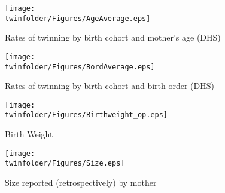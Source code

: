 \begin{figure}[htpb!]
\begin{center}
\caption{Rates of twinning by birth cohort and mother's age (DHS)}
\label{TWINfig:trend}
\texttt{[image: \\twinfolder/Figures/AgeAverage.eps]}
\vspace{-8mm}
\end{center}
\end{figure}

\begin{figure}[htpb!]
\begin{center}
\caption{Rates of twinning by birth cohort and birth order (DHS)}
\label{TWINfig:trendbord}
\texttt{[image: \\twinfolder/Figures/BordAverage.eps]}
\vspace{-8mm}
\end{center}
\end{figure}

\begin{figure}[htpb!]
\begin{center}
\caption{Birth Weight}
\label{TWINfig:Bwt}
\texttt{[image: \\twinfolder/Figures/Birthweight\_op.eps]} 
\end{center}
\end{figure}

\begin{figure}[htpb!]
\begin{center}
\caption{Size reported (retrospectively) by mother}
\label{TWINfig:size}
\texttt{[image: \\twinfolder/Figures/Size.eps]}
\vspace{-8mm}
\end{center}
\end{figure}




